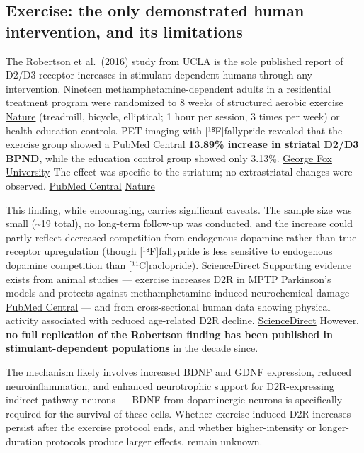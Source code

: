 \subsection{Exercise: the only demonstrated human intervention, and its limitations}\label{15_d2_downregulation-exercise-the-only-demonstrated-human-intervention-and-its-limitations}

The Robertson et al.~(2016) study from UCLA is the sole published report of D2/D3 receptor increases in stimulant-dependent humans through any intervention. Nineteen methamphetamine-dependent adults in a residential treatment program were randomized to 8 weeks of structured aerobic exercise \href{https://www.nature.com/articles/npp2015331}{Nature} (treadmill, bicycle, elliptical; 1 hour per session, 3 times per week) or health education controls. PET imaging with {[}¹⁸F{]}fallypride revealed that the exercise group showed a \href{https://pmc.ncbi.nlm.nih.gov/articles/PMC4832026/}{PubMed Central} \textbf{13.89\% increase in striatal D2/D3 BPND}, while the education control group showed only 3.13\%. \href{https://digitalcommons.georgefox.edu/cgi/viewcontent.cgi?article=1049&context=dmsc}{George Fox University} The effect was specific to the striatum; no extrastriatal changes were observed. \href{https://pmc.ncbi.nlm.nih.gov/articles/PMC4832026/}{PubMed Central} \href{https://www.nature.com/articles/npp2015331}{Nature}

This finding, while encouraging, carries significant caveats. The sample size was small (\textasciitilde19 total), no long-term follow-up was conducted, and the increase could partly reflect decreased competition from endogenous dopamine rather than true receptor upregulation (though {[}¹⁸F{]}fallypride is less sensitive to endogenous dopamine competition than {[}¹¹C{]}raclopride). \href{https://www.sciencedirect.com/science/article/abs/pii/S1053811919306251}{ScienceDirect} Supporting evidence exists from animal studies --- exercise increases D2R in MPTP Parkinson's models and protects against methamphetamine-induced neurochemical damage \href{https://pmc.ncbi.nlm.nih.gov/articles/PMC4832026/}{PubMed Central} --- and from cross-sectional human data showing physical activity associated with reduced age-related D2R decline. \href{https://www.sciencedirect.com/science/article/abs/pii/S1053811917300186}{ScienceDirect} However, \textbf{no full replication of the Robertson finding has been published in stimulant-dependent populations} in the decade since.

The mechanism likely involves increased BDNF and GDNF expression, reduced neuroinflammation, and enhanced neurotrophic support for D2R-expressing indirect pathway neurons --- BDNF from dopaminergic neurons is specifically required for the survival of these cells. Whether exercise-induced D2R increases persist after the exercise protocol ends, and whether higher-intensity or longer-duration protocols produce larger effects, remain unknown.

